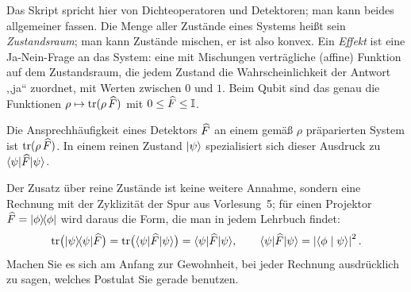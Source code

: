 \begin{webonly}
Das Skript spricht hier von Dichteoperatoren und Detektoren; man kann beides allgemeiner fassen. Die Menge aller Zustände eines Systems heißt sein \emph{Zustandsraum}; man kann Zustände mischen, er ist also konvex. Ein \emph{Effekt} ist eine Ja-Nein-Frage an das System: eine mit Mischungen verträgliche (affine) Funktion auf dem Zustandsraum, die jedem Zustand die Wahrscheinlichkeit der Antwort ,,ja`` zuordnet, mit Werten zwischen $0$ und $1$. Beim Qubit sind das genau die Funktionen $\rho\mapsto\operatorname{tr}(\rho\,\widehat{F})$ mit $0\leq\widehat{F}\leq\mathbb{I}$.
\end{webonly}


\begin{merksatz}[P4]
	Die Ansprechhäufigkeit eines Detektors $\widehat{F}$ an einem gemäß $\rho$ präparierten System ist $\operatorname{tr}(\rho\,\widehat{F})$. In einem reinen Zustand $\lvert \psi \rangle$ spezialisiert sich dieser Ausdruck zu $\langle \psi \rvert \widehat{F} \lvert \psi \rangle$.
\end{merksatz}
Der Zusatz über reine Zustände ist keine weitere Annahme, sondern eine Rechnung mit der Zyklizität der Spur aus Vorlesung~5; für einen Projektor $\widehat{F} = \lvert \phi \rangle\!\langle \phi \rvert$ wird daraus die Form, die man in jedem Lehrbuch findet:
\begin{equation}
	\operatorname{tr}\bigl(\lvert \psi \rangle\!\langle \psi \rvert\widehat{F}\bigr) = \operatorname{tr}\bigl(\langle \psi \rvert\widehat{F}\lvert \psi \rangle\bigr) = \langle \psi \rvert \widehat{F} \lvert \psi \rangle, \qquad \langle \psi \rvert \widehat{F} \lvert \psi \rangle = \left\lvert \langle \phi \mid \psi \rangle \right\rvert^2.
\end{equation}
Machen Sie es sich am Anfang zur Gewohnheit, bei jeder Rechnung ausdrücklich zu sagen, welches Postulat Sie gerade benutzen.

